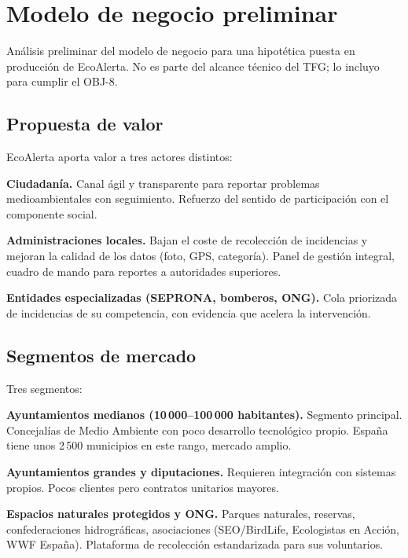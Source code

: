 \chapter{Modelo de negocio preliminar}
\label{app:modelo-negocio}

Análisis preliminar del modelo de negocio para una hipotética puesta en producción de EcoAlerta. No es parte del alcance técnico del TFG; lo incluyo para cumplir el OBJ-8.


\section*{Propuesta de valor}

EcoAlerta aporta valor a tres actores distintos:

\textbf{Ciudadanía.}  Canal ágil y transparente para reportar problemas medioambientales con seguimiento. Refuerzo del sentido de participación con el componente social.

\textbf{Administraciones locales.}  Bajan el coste de recolección de incidencias y mejoran la calidad de los datos (foto, GPS, categoría). Panel de gestión integral, cuadro de mando para reportes a autoridades superiores.

\textbf{Entidades especializadas (SEPRONA, bomberos, ONG).}  Cola priorizada de incidencias de su competencia, con evidencia que acelera la intervención.


\section*{Segmentos de mercado}

Tres segmentos:

\textbf{Ayuntamientos medianos (10\,000--100\,000 habitantes).}  Segmento principal. Concejalías de Medio Ambiente con poco desarrollo tecnológico propio. España tiene unos 2\,500 municipios en este rango, mercado amplio.

\textbf{Ayuntamientos grandes y diputaciones.}  Requieren integración con sistemas propios. Pocos clientes pero contratos unitarios mayores.

\textbf{Espacios naturales protegidos y ONG.}  Parques naturales, reservas, confederaciones hidrográficas, asociaciones (SEO/BirdLife, Ecologistas en Acción, WWF España). Plataforma de recolección estandarizada para sus voluntarios.


